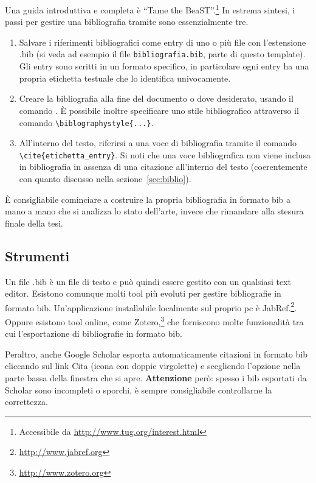\documentclass[12pt]{report}
\begin{document}
    Una guida introduttiva e completa \`e ``Tame the BeaST''.\footnote{Accessibile da \url{http://www.tug.org/interest.html}}
    In estrema sintesi, i passi per gestire una bibliografia tramite  sono essenzialmente tre.
    \begin{enumerate}
        \item Salvare i riferimenti bibliografici come entry di uno o pi\`u file con l'estensione .bib (si veda ad esempio il file \texttt{bibliografia.bib}, parte di questo template). Gli entry sono scritti in un formato specifico, in particolare ogni entry ha una propria etichetta testuale che lo identifica univocamente.
        \item Creare la bibliografia alla fine del documento o dove desiderato, usando il comando \verb||. \`E possibile inoltre specificare uno stile bibliografico attraverso il comando \verb|\biblographystyle{...}|.
        \item All'interno del testo, riferirsi a una voce di bibliografia tramite il comando\\ \verb|\cite{etichetta_entry}|. Si noti che una voce bibliografica non viene inclusa in bibliografia in assenza di una citazione all'interno del testo (coerentemente con quanto discusso nella sezione~\ref{sec:biblio}).
    \end{enumerate}

    \`E consigliabile cominciare a costruire la propria bibliografia in formato bib a mano a mano che si analizza lo stato dell'arte, invece che rimandare alla stesura finale della tesi.

    \subsection{Strumenti}

    Un file .bib \`e un file di testo e pu\`o quindi essere gestito con un qualsiasi text editor. Esistono comunque molti tool pi\`u evoluti per gestire bibliografie in formato bib. Un'applicazione installabile localmente sul proprio pc \`e JabRef.\footnote{\url{http://www.jabref.org}}. Oppure esistono tool online, come Zotero,\footnote{\url{http://www.zotero.org}} che forniscono molte funzionalità tra cui l'esportazione di bibliografie in formato bib.

    Peraltro, anche Google Scholar esporta automaticamente citazioni in formato bib cliccando sul link Cita (icona con doppie virgolette) e scegliendo l'opzione  nella parte bassa della finestra che si apre. \textbf{Attenzione} per\`o: spesso i bib esportati da Scholar sono incompleti o sporchi, \`e sempre consigliabile controllarne la correttezza.
\end{document}
